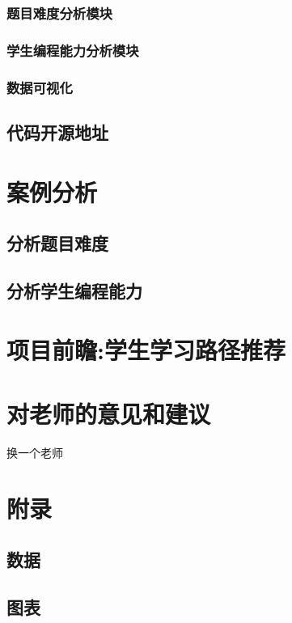 \documentclass[12pt,UTF-8,a4paper]{ctexart}
\begin{document}
\subsubsection{题目难度分析模块}
\subsubsection{学生编程能力分析模块}
\subsubsection{数据可视化}
\subsection{代码开源地址}
\section{案例分析}
\subsection{分析题目难度}
\subsection{分析学生编程能力}
\section{项目前瞻:学生学习路径推荐}
\section{对老师的意见和建议}
换一个老师
\section{附录}
\subsection{数据}
\subsection{图表}
\end{document}
